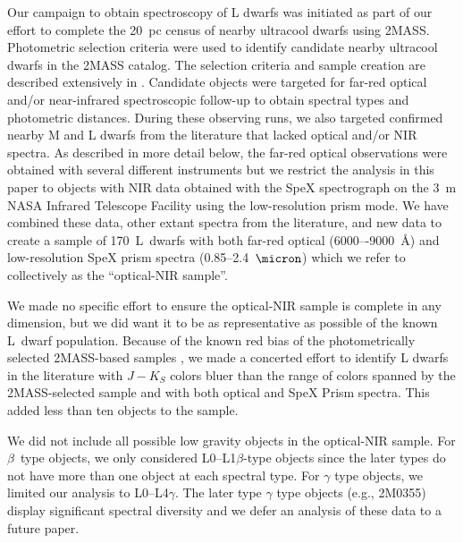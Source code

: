 \documentclass[12pt,preprint]{aastex}
\newcommand{\sample}{170}
\begin{document}
Our campaign to obtain spectroscopy of L dwarfs was initiated as part of our effort to complete the 20~pc census of nearby ultracool dwarfs using 2MASS. 
Photometric selection criteria were used to identify candidate nearby ultracool dwarfs in the 2MASS catalog. 
The selection criteria and sample creation are described extensively in \cite[Papers~III, V, and IX]{Cruz03,Cruz07,Reid08}. 
Candidate objects were targeted for far-red optical and/or near-infrared spectroscopic follow-up to obtain spectral types and photometric distances. 
During these observing runs, we also targeted confirmed nearby M and L dwarfs from the literature that lacked optical and/or NIR spectra.
As described in more detail below, the far-red optical observations were obtained with several different instruments but we restrict the analysis in this paper to objects with NIR data obtained with the SpeX spectrograph \citep{Spex} on the 3~m NASA Infrared Telescope Facility using the low-resolution prism mode.
We have combined these data, other extant spectra from the literature, and new data to create a sample of \sample~L~dwarfs with both far-red optical (6000–-9000~\AA) and low-resolution SpeX prism spectra (0.85--2.4~$\micron$) which we refer to collectively as the ``optical-NIR sample''. 

We made no specific effort to ensure the optical-NIR sample is complete in any dimension, but we did want it to be as representative as possible of the known L~dwarf population.
Because of the known red bias of the photometrically selected 2MASS-based samples \cite[Figure 3]{Schmidt10}, we made a concerted effort to identify L dwarfs in the literature with $J-K_S$ colors bluer than the range of colors spanned by the 2MASS-selected sample and with both optical and SpeX Prism spectra. 
This added less than ten objects to the sample.

We did not include all possible low gravity objects in the optical-NIR sample.
For $\beta$~type objects, we only considered L0--L1$\beta$-type objects since the later types do not have more than one object at each spectral type.
For $\gamma$ type objects, we limited our analysis to L0--L4$\gamma$. 
The later type $\gamma$ type objects (e.g., 2M0355) display significant spectral diversity and we defer an analysis of these data to a future paper.
\end{document}
